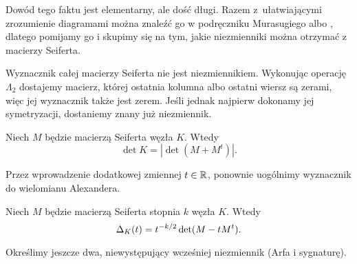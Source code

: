 Dowód tego faktu jest elementarny, ale dość długi.
Razem z~ułatwiającymi zrozumienie diagramami można znaleźć go w podręczniku Murasugiego albo \cite[s. 64]{kawauchi96}, dlatego pomijamy go i skupimy się na tym, jakie niezmienniki można otrzymać z macierzy Seiferta.

Wyznacznik całej macierzy Seiferta nie jest niezmiennikiem.
Wykonując operację $\Lambda_2$ dostajemy macierz, której ostatnia kolumna albo ostatni wiersz są zerami, więc jej wyznacznik także jest zerem.
Jeśli jednak najpierw dokonamy jej symetryzacji, dostaniemy znany już niezmiennik.

\begin{proposition}
    Niech $M$ będzie macierzą Seiferta węzła $K$.
    Wtedy
    \begin{equation}
        \det K = |\det(M + M^t)|.
    \end{equation}
\end{proposition}

%
Przez wprowadzenie dodatkowej zmiennej $t \in \mathbb R$, ponownie uogólnimy wyznacznik do wielomianu Alexandera.

\begin{proposition}
    Niech $M$ będzie macierzą Seiferta stopnia $k$ węzła $K$.
    Wtedy
    \begin{equation}
        \Delta_K (t) = t^{-k/2}\det(M - tM^t).
    \end{equation}
\end{proposition}

Określimy jeszcze dwa, niewystępujący wcześniej niezmiennik (Arfa i sygnaturę).

